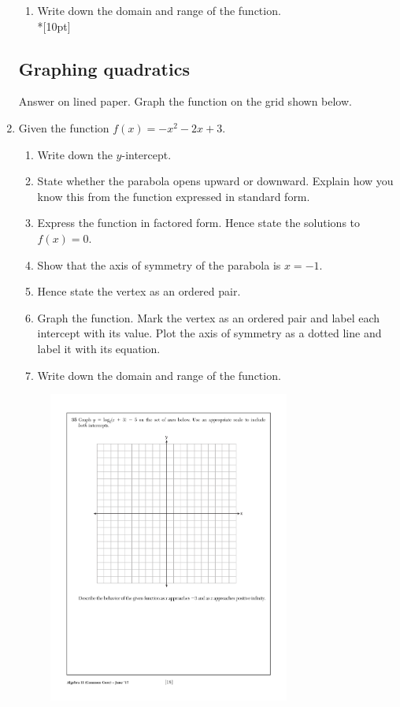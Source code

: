 \documentclass[]{book}
\begin{document}
\begin{enumerate}
\begin{enumerate}
    \item Write down the domain and range of the function.\\*[10pt]
\end{enumerate}


\newpage
\subsection*{Graphing quadratics}
Answer on lined paper. Graph the function on the grid shown below.
\item Given the function $f(x)=-x^2-2x+3$. 
\begin{enumerate}
    \item Write down the $y$-intercept.
    \item State whether the parabola opens upward or downward. Explain how you know this from the function expressed in standard form.
    \item Express the function in factored form. Hence state the solutions to $f(x)=0$.
    \item Show that the axis of symmetry of the parabola is $x=-1$.
    \item Hence state the vertex as an ordered pair. 
    \item Graph the function. Mark the vertex as an ordered pair and label each intercept with its value. Plot the axis of symmetry as a dotted line and label it with its equation.
    \item Write down the domain and range of the function.
\end{enumerate}

\begin{figure}[!ht]
    \centering
    \includegraphics[width=0.75\textwidth]{regents-grid.pdf}
\end{figure}

\end{enumerate}

 
\end{document}
